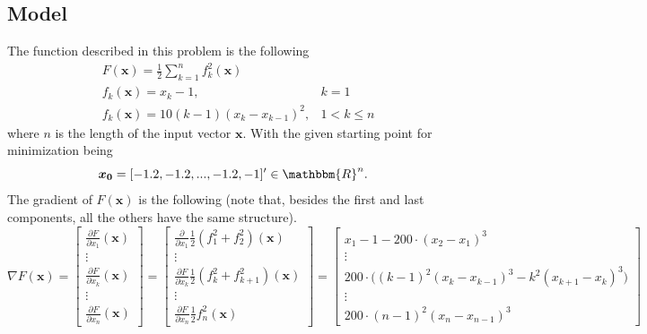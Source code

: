 \subsection*{Model}
The function described in this problem is the following 
\begin{equation*}
\begin{aligned}
    &F(\boldsymbol{x}) = \frac{1}{2}\sum_{k=1}^n f_k^2(\boldsymbol{x}) \\
    &f_k(\boldsymbol{x}) = x_k-1, & k=1 \\
    &f_k(\boldsymbol{x}) = 10(k-1)(x_k - x_{k-1})^2, & 1<k\leq n
\end{aligned}
\end{equation*}
where $n$ is the length of the input vector $\boldsymbol{x}$.
With the given starting point for minimization being 
\[\boldsymbol{x_0}=[-1.2,-1.2,...,-1.2,-1]' \in \mathbbm{R}^n.\]
The gradient of $F(\boldsymbol{x})$ is the following (note that, besides the first and last components, all the others have the same structure).
\begin{equation*}
    \nabla F(\mathbf{x}) = 
    \begin{bmatrix}
        \frac{\partial F}{\partial x_1}(\mathbf{\boldsymbol{x}}) \\
        \vdots \\
        \frac{\partial F}{\partial x_k}(\mathbf{\boldsymbol{x}}) \\
        \vdots \\
        \frac{\partial F}{\partial x_n}(\mathbf{\boldsymbol{x}})
    \end{bmatrix}
    =
    \begin{bmatrix}
        \frac{\partial }{\partial x_1}\frac{1}{2}(f_1^2+f_2^2)(\boldsymbol{x}) \\
        \vdots \\
        \frac{\partial F}{\partial x_k}\frac{1}{2}(f_k^2+f_{k+1}^2)(\boldsymbol{x}) \\
        \vdots \\
        \frac{\partial F}{\partial x_n}\frac{1}{2}f_n^2(\boldsymbol{x})
    \end{bmatrix}
    =
    \begin{bmatrix}
        x_1-1-200\cdot (x_2-x_1)^3 \\
        \vdots \\
        200 \cdot \Big((k-1)^2(x_k-x_{k-1})^3-k^2(x_{k+1}-x_k)^3\Big)\\
        \vdots \\
        200 \cdot (n-1)^2(x_n-x_{n-1})^3
    \end{bmatrix}
\end{equation*}
